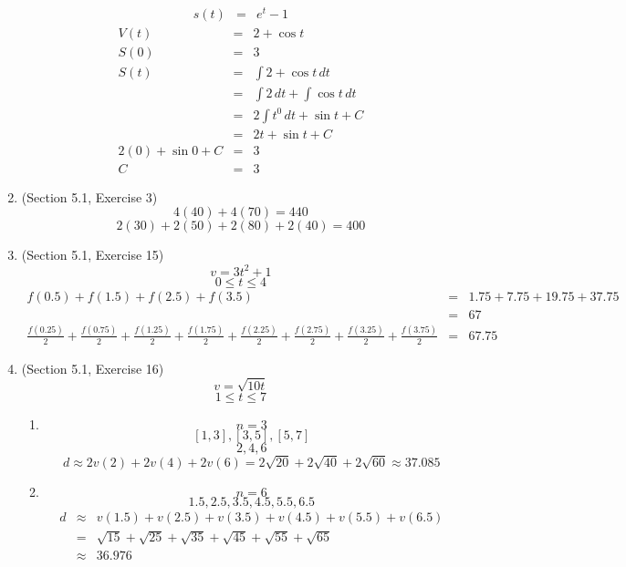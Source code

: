 \documentclass{article}
\begin{document}
\begin{enumerate}
\begin{eqnarray}
            s(t) &=& e^t - 1
        \end{eqnarray}
        \begin{eqnarray}
            V(t) &=& 2 + \cos{t} \\
            S(0) &=& 3 \\
            S(t) &=& \int{2 + \cos{t}}\,dt \\
                 &=& \int{2}\,dt + \int{\cos{t}}\,dt \\
                 &=& 2\int{t^0}\,dt + \sin{t} + C \\
                 &=& 2t + \sin{t} + C \\
            2(0) + \sin{0} + C &=& 3 \\
            C &=& 3
        \end{eqnarray}
    \item (Section 5.1, Exercise 3)
        $$4(40) + 4(70) = 440$$
        $$2(30) + 2(50) + 2(80) + 2(40) = 400$$
    \item (Section 5.1, Exercise 15)
        $$v = 3t^2 + 1$$
        $$0 \leq t \leq 4$$
        \begin{eqnarray}
            f(0.5) + f(1.5) + f(2.5) + f(3.5) &=& 1.75 + 7.75 + 19.75 + 37.75 \\
                                              &=& 67 \\
            \frac{f(0.25)}{2} + \frac{f(0.75)}{2} + \frac{f(1.25)}{2} + \frac{f(1.75)}{2} + \frac{f(2.25)}{2} + \frac{f(2.75)}{2} + \frac{f(3.25)}{2} + \frac{f(3.75)}{2} &=& 67.75
        \end{eqnarray}
    \item (Section 5.1, Exercise 16)
        $$v = \sqrt{10t}$$
        $$1 \leq t \leq 7$$
        \begin{enumerate}
            \item
            $$n = 3$$
            $$[1,3],[3,5],[5,7]$$
            $$2,4,6$$
            $$d \approx 2v(2) + 2v(4) + 2v(6) = 2\sqrt{20} + 2\sqrt{40} + 2\sqrt{60} \approx 37.085$$
            \item
            $$n = 6$$
            $$1.5,2.5,3.5,4.5,5.5,6.5$$
            \begin{eqnarray}
                d &\approx& v(1.5) + v(2.5) + v(3.5) + v(4.5) + v(5.5) + v(6.5) \\
                  &=& \sqrt{15} + \sqrt{25} + \sqrt{35} + \sqrt{45} + \sqrt{55} + \sqrt{65} \\
                  &\approx& 36.976
            \end{eqnarray}

\end{enumerate}
\end{enumerate}
\end{document}
